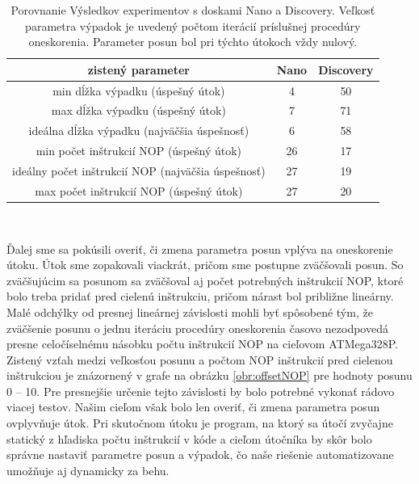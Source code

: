 \begin{table}
    \caption[Porovnanie Výsledkov experimentov]{Porovnanie Výsledkov experimentov s doskami Nano a Discovery. Veľkosť parametra výpadok je uvedený počtom iterácií príslušnej procedúry oneskorenia. Parameter posun bol pri týchto útokoch vždy nulový.}
    \label{tab:experiments}
    \begin{center}
    \begin{tabular}{|c|c|c|}
        \hline
        zistený parameter & Nano & Discovery \\
        \hline
        min dĺžka výpadku (úspešný útok) & 4 & 50 \\
        \hline
        max dĺžka výpadku (úspešný útok) & 7 & 71 \\
        \hline
        ideálna dĺžka výpadku (najväčšia úspešnosť) & 6 & 58 \\
        \hline
        min počet inštrukcií NOP (úspešný útok) & 26 & 17 \\
        \hline
        ideálny počet inštrukcií NOP (najväčšia úspešnosť) & 27 & 19 \\
        \hline
        max počet inštrukcií NOP (úspešný útok) & 27 & 20 \\
        \hline
    \end{tabular}\\[6pt]
    \end{center}
\end{table}

Ďalej sme sa pokúsili overiť, či zmena parametra posun vplýva na oneskorenie útoku. Útok sme zopakovali viackrát, pričom sme postupne zväčšovali posun. So zväčšujúcim sa posunom sa zväčšoval aj počet potrebných inštrukcií NOP, ktoré bolo treba pridať pred cielenú inštrukciu, pričom nárast bol približne lineárny. Malé odchýlky od presnej lineárnej závislosti mohli byť spôsobené tým, že zväčšenie posunu o jednu iteráciu procedúry oneskorenia časovo nezodpovedá presne celočíselnému násobku počtu inštrukcií NOP na cieľovom ATMega328P. Zistený vzťah medzi veľkosťou posunu a počtom NOP inštrukcií pred cielenou inštrukciou je znázornený v grafe na obrázku \ref{obr:offsetNOP} pre hodnoty posunu 0 -- 10. Pre presnejšie určenie tejto závislosti by bolo potrebné vykonať rádovo viacej testov. Našim cieľom však bolo len overiť, či zmena parametra posun ovplyvňuje útok. Pri skutočnom útoku je program, na ktorý sa útočí zvyčajne statický z hľadiska počtu inštrukcií v kóde a cieľom útočníka by skôr bolo správne nastaviť parametre posun a výpadok, čo naše riešenie automatizovane umožňuje aj dynamicky za behu.

